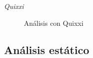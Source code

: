 \documentclass[12pt,twoside]{article}
\begin{document}
\textit{Quixxi}
\begin{figure}[H]
    \centering
    \caption{Análisis con Quixxi}
\end{figure}
\subsection{Análisis estático}
\end{document}
